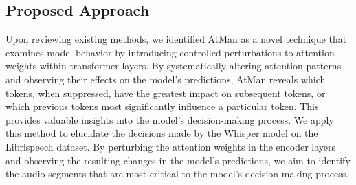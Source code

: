 \documentclass[../report.tex]{subfiles}
\begin{document}
    \subsection{Proposed Approach}
    \label{sec:introduction:proposed_approach}

    Upon reviewing existing methods, we identified AtMan \cite{NEURIPS2023_c83bc020} as a novel technique that examines model behavior by introducing controlled perturbations to attention weights within transformer layers. By systematically altering attention patterns and observing their effects on the model's predictions, AtMan reveals which tokens, when suppressed, have the greatest impact on subsequent tokens, or which previous tokens most significantly influence a particular token. This provides valuable insights into the model's decision-making process. We apply this method to elucidate the decisions made by the Whisper model \cite{radford2023robust} on the Librispeech \cite{panayotov2015librispeech} dataset. By perturbing the attention weights in the encoder layers and observing the resulting changes in the model's predictions, we aim to identify the audio segments that are most critical to the model's decision-making process.
\end{document}
